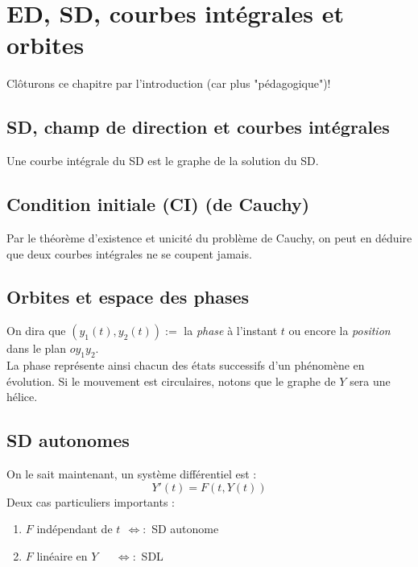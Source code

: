 \documentclass[11pt, a4paper, openany]{book}
\begin{document}
\setcounter{section}{0}
\section{ED, SD, courbes intégrales et orbites}
Clôturons ce chapitre par l'introduction (car plus "pédagogique")! 
\subsection{SD, champ de direction et courbes intégrales}
Une courbe intégrale du SD est le graphe de la solution du SD.
		
\subsection{Condition initiale (CI) (de Cauchy)}
Par le théorème d'existence et unicité du problème de Cauchy, on peut en déduire que deux courbes intégrales ne se coupent jamais.
		
\subsection{Orbites et espace des phases}
On dira que $(y_1(t), y_2(t)) :=$ la \textit{phase} à l'instant $t$ ou encore la \textit{position} dans le plan $oy_1y_2$.\\
La phase représente ainsi chacun des états successifs d'un phénomène en évolution. Si le mouvement est circulaires, notons que le graphe de $Y$ sera une hélice.
		
\subsection{SD autonomes}
On le sait maintenant, un système différentiel est :
\begin{equation}
	Y'(t) = F(t, Y(t))
\end{equation}
Deux cas particuliers importants : 
\begin{enumerate}
	\item $F$ indépendant de $t\ \ \Leftrightarrow : $ SD autonome
	\item $F$ linéaire en $Y\ \ \ \ \ \ \ \Leftrightarrow : $ SDL
\end{enumerate}
		
		
		
		
		
		
		
		
		
		
		
		
		
\end{document}
